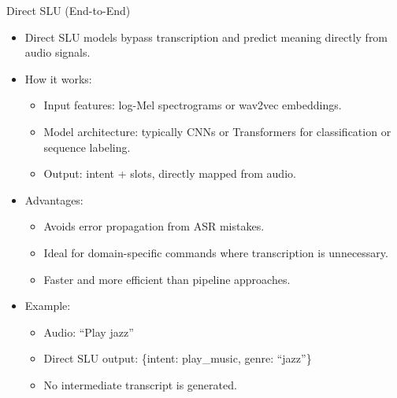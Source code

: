 \begin{frame}[allowframebreaks]{Direct SLU (End-to-End)}

\begin{itemize}
    \item Direct SLU models bypass transcription and predict meaning directly from audio signals.

    \item How it works:
    \begin{itemize}
        \item Input features: log-Mel spectrograms or wav2vec embeddings.
        \item Model architecture: typically CNNs or Transformers for classification or sequence labeling.
        \item Output: intent + slots, directly mapped from audio.
    \end{itemize}
\framebreak
    \item Advantages:
    \begin{itemize}
        \item Avoids error propagation from ASR mistakes.
        \item Ideal for domain-specific commands where transcription is unnecessary.
        \item Faster and more efficient than pipeline approaches.
    \end{itemize}

    \item Example:
    \begin{itemize}
        \item Audio: ``Play jazz''  
        \item Direct SLU output: \{intent: play\_music, genre: ``jazz''\}  
        \item No intermediate transcript is generated.
    \end{itemize}
\end{itemize}

\end{frame}


